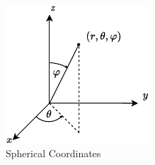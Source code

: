 \begin{figure}[H]
    \begin{center}
    \includegraphics[width=\textwidth/2]{figures/background/spherical.pdf}
    \end{center}
    \caption[Spherical Coordinates]{Spherical Coordinates}
    \label{fig:spherical}
\end{figure}
